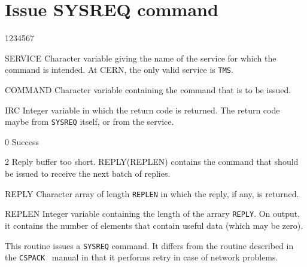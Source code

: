 \section{Issue SYSREQ command}
\begin{DLtt}{1234567}
\item[SERVICE]Character variable giving the name of the service
for which the command is intended. At CERN, the only valid service
is {\tt TMS}.
\item[COMMAND]Character variable containing the command that is
to be issued.
\item[IRC]Integer variable in which the return code is returned.
The return code maybe from {\tt SYSREQ} itself, or from the
service. 
\begin{DLtt}{12}
\item[0]Success
\item[2]Reply buffer too short. REPLY(REPLEN) contains the
command that should be issued to receive the next
batch of replies.
\end{DLtt}
\item[REPLY]Character array of length {\tt REPLEN} in which
the reply, if any, is returned. 
\item[REPLEN]Integer variable containing the length of the
arrary {\tt REPLY}. On output, it contains the number of
elements that contain useful data (which may be zero).
\end{DLtt}

This routine issues a {\tt SYSREQ} command. It differs from
the routine  described in the {\tt CSPACK}~\cite{bib-CSPACK}
manual in that it performs retry in case of network problems.

